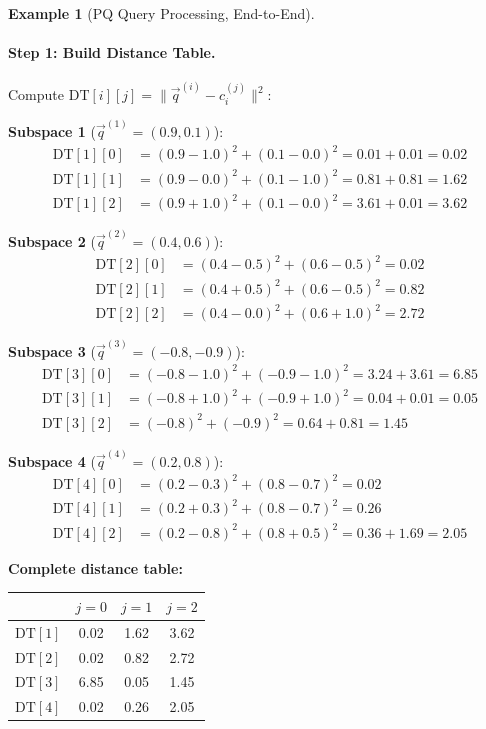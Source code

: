 \documentclass[11pt,a4paper]{article}
\theoremstyle{definition}
\newtheorem{example}{Example}[section]
\theoremstyle{plain}
\begin{document}
\begin{example}[PQ Query Processing, End-to-End]
\paragraph{Step 1: Build Distance Table.}
Compute $\mathrm{DT}[i][j] = \|\vec{q}^{(i)} - c_i^{(j)}\|^2$:

\textbf{Subspace 1} ($\vec{q}^{(1)} = (0.9, 0.1)$):
\begin{align*}
\mathrm{DT}[1][0] &= (0.9{-}1.0)^2 + (0.1{-}0.0)^2 = 0.01 + 0.01 = \mathbf{0.02} \\
\mathrm{DT}[1][1] &= (0.9{-}0.0)^2 + (0.1{-}1.0)^2 = 0.81 + 0.81 = \mathbf{1.62} \\
\mathrm{DT}[1][2] &= (0.9{+}1.0)^2 + (0.1{-}0.0)^2 = 3.61 + 0.01 = \mathbf{3.62}
\end{align*}

\textbf{Subspace 2} ($\vec{q}^{(2)} = (0.4, 0.6)$):
\begin{align*}
\mathrm{DT}[2][0] &= (0.4{-}0.5)^2 + (0.6{-}0.5)^2 = \mathbf{0.02} \\
\mathrm{DT}[2][1] &= (0.4{+}0.5)^2 + (0.6{-}0.5)^2 = \mathbf{0.82} \\
\mathrm{DT}[2][2] &= (0.4{-}0.0)^2 + (0.6{+}1.0)^2 = \mathbf{2.72}
\end{align*}

\textbf{Subspace 3} ($\vec{q}^{(3)} = (-0.8, -0.9)$):
\begin{align*}
\mathrm{DT}[3][0] &= (-0.8{-}1.0)^2 + (-0.9{-}1.0)^2 = 3.24 + 3.61 = \mathbf{6.85} \\
\mathrm{DT}[3][1] &= (-0.8{+}1.0)^2 + (-0.9{+}1.0)^2 = 0.04 + 0.01 = \mathbf{0.05} \\
\mathrm{DT}[3][2] &= (-0.8)^2 + (-0.9)^2 = 0.64 + 0.81 = \mathbf{1.45}
\end{align*}

\textbf{Subspace 4} ($\vec{q}^{(4)} = (0.2, 0.8)$):
\begin{align*}
\mathrm{DT}[4][0] &= (0.2{-}0.3)^2 + (0.8{-}0.7)^2 = \mathbf{0.02} \\
\mathrm{DT}[4][1] &= (0.2{+}0.3)^2 + (0.8{-}0.7)^2 = \mathbf{0.26} \\
\mathrm{DT}[4][2] &= (0.2{-}0.8)^2 + (0.8{+}0.5)^2 = 0.36 + 1.69 = \mathbf{2.05}
\end{align*}

\textbf{Complete distance table:}
\begin{center}
\begin{tabular}{lccc}
\toprule
& $j = 0$ & $j = 1$ & $j = 2$ \\
\midrule
$\mathrm{DT}[1]$ & 0.02 & 1.62 & 3.62 \\
$\mathrm{DT}[2]$ & 0.02 & 0.82 & 2.72 \\
$\mathrm{DT}[3]$ & 6.85 & 0.05 & 1.45 \\
$\mathrm{DT}[4]$ & 0.02 & 0.26 & 2.05 \\
\bottomrule
\end{tabular}
\end{center}


\end{example}
\end{document}
